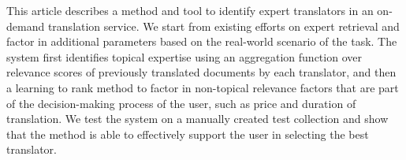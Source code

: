 
This article describes a method and tool to identify expert translators in an on-demand translation service. We start from existing efforts on expert retrieval and factor in additional parameters based on the real-world scenario of the task. The system first identifies topical expertise using an aggregation function over relevance scores of previously translated documents by each translator, and then a learning to rank method to factor in non-topical relevance factors that are part of the decision-making process of the user, such as price and duration of translation. We test the system on a manually created test collection and show that the method is able to effectively support the user in selecting the best translator. 